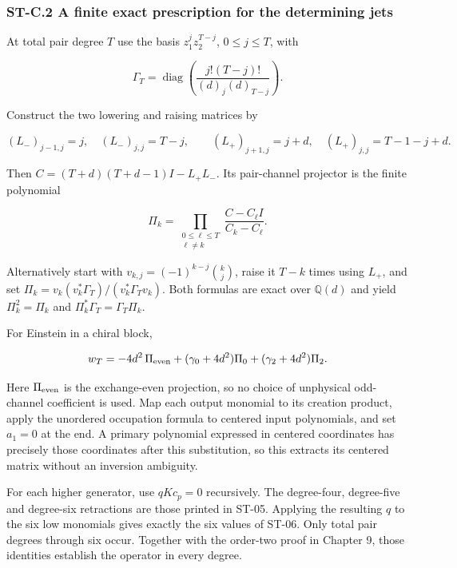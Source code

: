 \hypertarget{st-c.2-a-finite-exact-prescription-for-the-determining-jets}{%
\subsubsection{ST-C.2 A finite exact prescription for the determining jets}\label{st-c.2-a-finite-exact-prescription-for-the-determining-jets}}

At total pair degree \(T\) use the basis \(z_1^jz_2^{T-j}\), \(0\leq j\leq T\), with

\[
\Gamma_T=\operatorname{diag}\left(
\frac{j!(T-j)!}{(d)_j(d)_{T-j}}\right).
\]

Construct the two lowering and raising matrices by

\[
(L_-)_{j-1,j}=j,\quad (L_-)_{j,j}=T-j,
\qquad
(L_+)_{j+1,j}=j+d,\quad (L_+)_{j,j}=T-1-j+d.
\]

Then \(C=(T+d)(T+d-1)I-L_+L_-\). Its pair-channel projector is the finite polynomial

\[
\Pi_k=\prod_{\substack{0\leq\ell\leq T\\\ell\ne k}}
\frac{C-C_\ell I}{C_k-C_\ell}.
\]

Alternatively start with \(v_{k,j}=(-1)^{k-j}\binom kj\), raise it \(T-k\) times using \(L_+\), and set \(\Pi_k=v_k(v_k^*\Gamma_T)/(v_k^*\Gamma_Tv_k)\). Both formulas are exact over \(\mathbb Q(d)\) and yield \(\Pi_k^2=\Pi_k\) and \(\Pi_k^*\Gamma_T=\Gamma_T\Pi_k\).

For Einstein in a chiral block,

\[
w_T=-4d^2\,\Pi_{\rm even}
+(\gamma_0+4d^2)\Pi_0+(\gamma_2+4d^2)\Pi_2.
\]

Here \(\Pi_{\rm even}\) is the exchange-even projection, so no choice of unphysical odd-channel coefficient is used. Map each output monomial to its creation product, apply the unordered occupation formula to centered input polynomials, and set \(a_1=0\) at the end. A primary polynomial expressed in centered coordinates has precisely those coordinates after this substitution, so this extracts its centered matrix without an inversion ambiguity.

For each higher generator, use \(qKc_p=0\) recursively. The degree-four, degree-five and degree-six retractions are those printed in ST-05. Applying the resulting \(q\) to the six low monomials gives exactly the six values of ST-06. Only total pair degrees through six occur. Together with the order-two proof in Chapter 9, those identities establish the operator in every degree.

